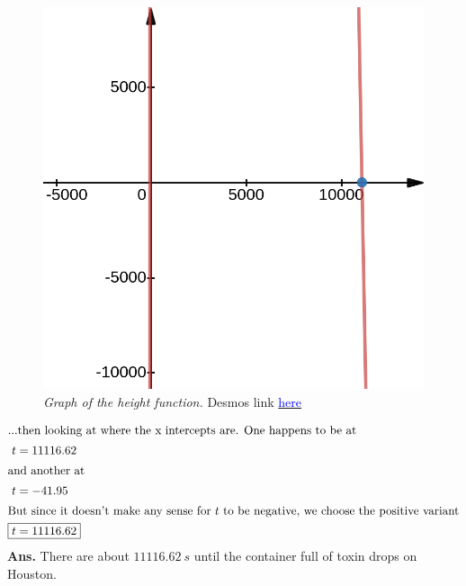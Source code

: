 \documentclass[12pt]{article}
\begin{document}
\begin{figure}[ht]
  \begin{center}
    \includegraphics[scale=.3]{disc-5-terminal-velocity-height-function.png}
    \caption{\textit{Graph of the height function.} Desmos link \href{https://www.desmos.com/calculator/cvnkkwav9r}{\textcolor{blue}{here}}}
  \end{center}
\end{figure}
\begin{align}
  \intertext{...then looking at where the x intercepts are. One happens to be at }
  t         & =11116.62  \\
  \intertext{and another at }
  t         & =-41.95    \\
  \intertext{But since it doesn't make any sense for $t$ to be negative, we choose the positive variant}
  \Aboxed{t & =11116.62}
\end{align}
\textbf{Ans.} There are about $11116.62\: s$ until the container full of toxin drops on Houston.
\end{document}
